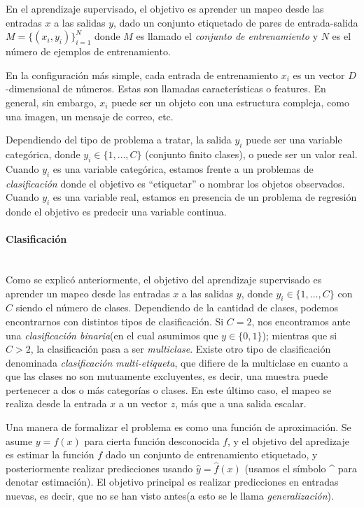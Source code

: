	En el aprendizaje supervisado, el objetivo es aprender un mapeo desde las entradas $x$ a las salidas $y$, dado un conjunto etiquetado de pares de entrada-salida $M=\{(x_i,y_i)\}^{N}_{i=1}$ donde $M$ es llamado el \textit{conjunto de entrenamiento} y $N$ es el número de ejemplos de entrenamiento.
	
	En la configuración más simple, cada entrada de entrenamiento $x_i$ es un vector $D$-dimensional de números. Estas son llamadas características o features. En general, sin embargo, $x_i$ puede ser un objeto con una estructura compleja, como una imagen, un mensaje de correo, etc.
	
	Dependiendo del tipo de problema a tratar, la salida $y_i$ puede ser una variable categórica, donde $y_i \in \{1,\dots,C\}$ (conjunto finito clases), o puede ser un valor real. Cuando $y_i$ es una variable categórica, estamos frente a un problemas de \textit{clasificación} donde el objetivo es ``etiquetar'' o nombrar los objetos observados. Cuando $y_i$ es una variable real, estamos en presencia de un problema de regresión donde el objetivo es predecir una variable continua.
	
	\paragraph{Clasificación}  ~\\
	
		Como se explicó anteriormente, el objetivo del aprendizaje supervisado es aprender un mapeo desde las entradas $x$ a las salidas $y$, donde $y_i \in \{1,\dots,C\}$ con $C$ siendo el número de clases. Dependiendo de la cantidad de clases, podemos encontrarnos con distintos tipos de clasificación. Si $C=2$, nos encontramos ante una \textit{clasificación binaria}(en el cual asumimos que $y\in\{0,1\}$); mientras que si $C>2$, la clasificación pasa a ser \textit{multiclase}. Existe otro tipo de clasificación denominada \textit{clasificación multi-etiqueta}, que difiere de la multiclase en cuanto a que las clases no son mutuamente excluyentes, es decir, una muestra puede pertenecer a dos o más categorías o clases. En este último caso, el mapeo se realiza desde la entrada $x$ a un vector $z$, más que a una salida escalar.
		
		Una manera de formalizar el problema es como una función de aproximación. Se asume $y = f(x)$ para cierta función desconocida $f$, y el objetivo del apredizaje es estimar la función $f$ dado un conjunto de entrenamiento etiquetado, y posteriormente realizar predicciones usando $\hat{y} = \hat{f}(x)$ (usamos el símbolo \string^ para denotar estimación). El objetivo principal es realizar predicciones en entradas nuevas, es decir, que no se han visto antes(a esto se le llama \textit{generalización}).
		
